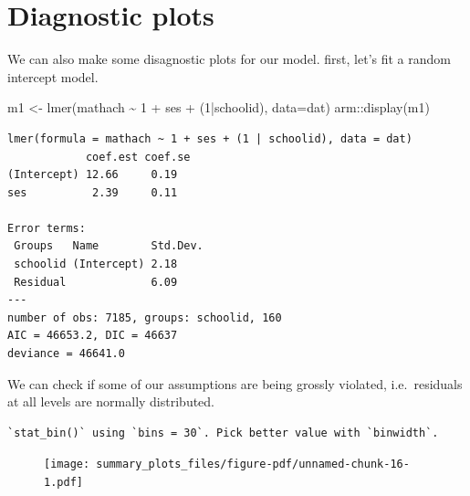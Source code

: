\documentclass[
  letterpaper,
  DIV=11,
  numbers=noendperiod]{scrreprt}
\newenvironment{Shaded}{\begin{snugshade}}{\end{snugshade}}
\newcommand{\AttributeTok}[1]{\textcolor[rgb]{0.49,0.56,0.16}{#1}}
\newcommand{\DecValTok}[1]{\textcolor[rgb]{0.25,0.63,0.44}{#1}}
\newcommand{\FunctionTok}[1]{\textcolor[rgb]{0.02,0.16,0.49}{#1}}
\newcommand{\NormalTok}[1]{\textcolor[rgb]{0.00,0.44,0.13}{#1}}
\newcommand{\OtherTok}[1]{\textcolor[rgb]{0.00,0.44,0.13}{#1}}
\newcommand{\SpecialCharTok}[1]{\textcolor[rgb]{0.25,0.44,0.63}{#1}}
\newcommand{\StringTok}[1]{\textcolor[rgb]{0.25,0.44,0.63}{#1}}
\begin{document}
\hypertarget{diagnostic-plots}{%
\section{Diagnostic plots}\label{diagnostic-plots}}

We can also make some disagnostic plots for our model. first, let's fit
a random intercept model.

\begin{Shaded}
\begin{Highlighting}[]
\NormalTok{m1 }\OtherTok{\textless{}{-}} \FunctionTok{lmer}\NormalTok{(mathach }\SpecialCharTok{\textasciitilde{}} \DecValTok{1} \SpecialCharTok{+}\NormalTok{ ses }\SpecialCharTok{+}\NormalTok{ (}\DecValTok{1}\SpecialCharTok{|}\NormalTok{schoolid), }\AttributeTok{data=}\NormalTok{dat)}
\NormalTok{arm}\SpecialCharTok{::}\FunctionTok{display}\NormalTok{(m1)}
\end{Highlighting}
\end{Shaded}

\begin{verbatim}
lmer(formula = mathach ~ 1 + ses + (1 | schoolid), data = dat)
            coef.est coef.se
(Intercept) 12.66     0.19  
ses          2.39     0.11  

Error terms:
 Groups   Name        Std.Dev.
 schoolid (Intercept) 2.18    
 Residual             6.09    
---
number of obs: 7185, groups: schoolid, 160
AIC = 46653.2, DIC = 46637
deviance = 46641.0 
\end{verbatim}

We can check if some of our assumptions are being grossly violated,
i.e.~residuals at all levels are normally distributed.

\begin{Shaded}
\end{Shaded}

\begin{verbatim}
`stat_bin()` using `bins = 30`. Pick better value with `binwidth`.
\end{verbatim}

\begin{figure}[H]

{\centering \texttt{[image: summary\_plots\_files/figure-pdf/unnamed-chunk-16-1.pdf]}

}

\end{figure}
\end{document}
